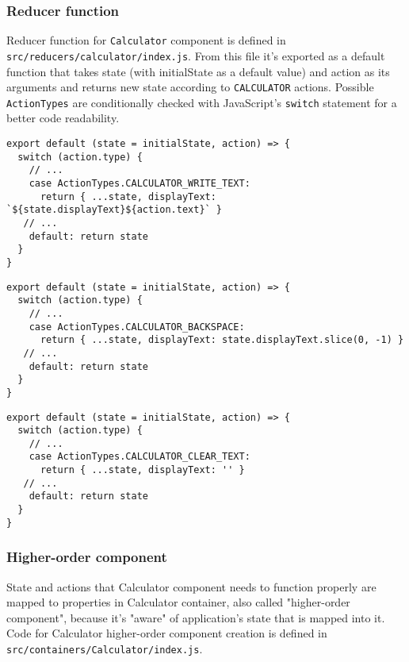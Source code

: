 \subsubsection{Reducer function}
Reducer function for \texttt{Calculator} component is defined in \texttt{src/reducers/calculator/index.js}. From this file it's exported as a default function that takes state (with initialState as a default value) and action as its arguments and returns new state according to \texttt{CALCULATOR} actions. Possible \texttt{ActionTypes} are conditionally checked with JavaScript's \texttt{switch} statement for a better code readability.

\begin{lstlisting}[caption={Addition of text to \texttt{state.calculator.displayText} when action of type \texttt{CALCULATOR_WRITE_TEXT} is dispatched.},captionpos=b]
export default (state = initialState, action) => {
  switch (action.type) {
    // ...
    case ActionTypes.CALCULATOR_WRITE_TEXT:
      return { ...state, displayText: `${state.displayText}${action.text}` }
   // ...
    default: return state
  }
}
\end{lstlisting}

\begin{lstlisting}[caption={Remove one character from  \texttt{state.calculator.displayText} when action of type \texttt{CALCULATOR_BACKSPACE} is dispatched.},captionpos=b]
export default (state = initialState, action) => {
  switch (action.type) {
    // ...
    case ActionTypes.CALCULATOR_BACKSPACE:
      return { ...state, displayText: state.displayText.slice(0, -1) }
   // ...
    default: return state
  }
}
\end{lstlisting}

\begin{lstlisting}[caption={Clear the \texttt{state.calculator.displayText} when action of type \texttt{CALCULATOR_CLEAR_TEXT} is dispatched.},captionpos=b]
export default (state = initialState, action) => {
  switch (action.type) {
    // ...
    case ActionTypes.CALCULATOR_CLEAR_TEXT:
      return { ...state, displayText: '' }
   // ...
    default: return state
  }
}
\end{lstlisting}

\subsubsection{Higher-order component}
State and actions that Calculator component needs to function properly are mapped to properties in Calculator container, also called "higher-order component", because it's "aware" of application's state that is mapped into it. Code for Calculator higher-order component creation is defined in \texttt{src/containers/Calculator/index.js}.

